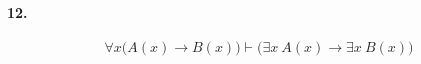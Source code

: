 \documentclass[]{exam}
\begin{document}
\paragraph[12.1]{12.}

$$\forall x \biggl(A(x) \rightarrow B(x)\biggr)
\vdash \biggl(\exists x \: A(x) \rightarrow \exists x \: B(x)\biggr)$$
\end{document}
